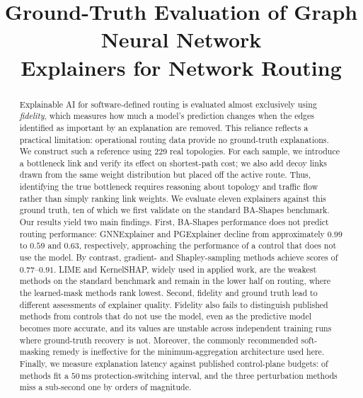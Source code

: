 \documentclass[conference]{IEEEtran}
\begin{document}
\title{Ground-Truth Evaluation of Graph Neural Network\\Explainers for Network Routing}

\author{
}

\maketitle

\begin{abstract}
Explainable AI for software-defined routing is evaluated almost exclusively
using \emph{fidelity}, which measures how much a model's prediction changes
when the edges identified as important by an explanation are removed. This
reliance reflects a practical limitation: operational routing data provide no
ground-truth explanations. We construct such a reference using 229 real
topologies. For each sample, we introduce a bottleneck link and verify its
effect on shortest-path cost; we also add decoy links drawn from the same
weight distribution but placed off the active route. Thus, identifying the
true bottleneck requires reasoning about topology and traffic flow rather than
simply ranking link weights. We evaluate eleven explainers against this ground
truth, ten of which we first validate on the standard BA-Shapes benchmark. Our results yield two main findings. First, BA-Shapes performance
does not predict routing performance: GNNExplainer and PGExplainer decline
from approximately $0.99$ to $0.59$ and $0.63$, respectively, approaching the
performance of a control that does not use the model. By contrast, gradient-
and Shapley-sampling methods achieve scores of $0.77$--$0.91$. LIME and KernelSHAP, widely used in applied work, are the
weakest methods on the standard benchmark and remain in the lower half on
routing, where the learned-mask methods rank lowest.
Second, fidelity and ground truth lead to different assessments of explainer
quality. Fidelity also fails to distinguish published methods from controls
that do not use the model, even as the predictive model becomes more accurate,
and its values are unstable across independent training runs where
ground-truth recovery is not.
Moreover, the commonly recommended soft-masking remedy is ineffective for
the minimum-aggregation architecture used here. Finally, we measure explanation latency against published
control-plane budgets: \NFitsFifty{} of \NDelayMethods{} methods fit a
$50$\,ms protection-switching interval, and the three perturbation methods
miss a sub-second one by orders of magnitude.
\end{abstract}
\end{document}
